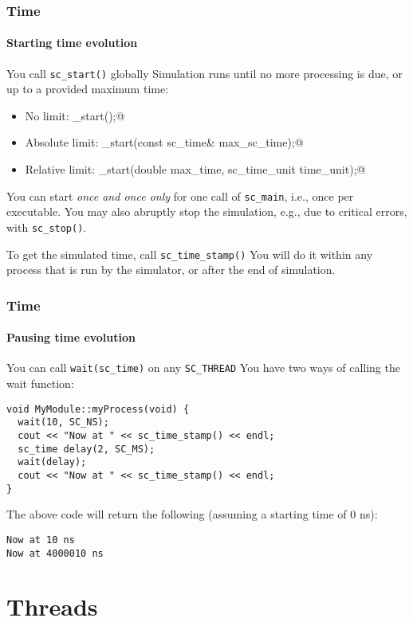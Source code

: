 \begin{frame}[fragile]
\frametitle{Time}
\framesubtitle{Starting time evolution}

\begin{block}{You call \texttt{sc\_start()} globally}
\vspace{0.5em}
Simulation runs until no more processing is due, or up to a provided maximum time:
\begin{itemize}
\item No limit: {\small \verb@sc_start();@ }
\item Absolute limit: {\small \verb@sc_start(const sc_time& max_sc_time);@ }
\item Relative limit: {\small \verb@sc_start(double max_time, sc_time_unit time_unit);@ }
\end{itemize}
You can start {\em once and once only} for one call of \texttt{sc\_main}, i.e., once per executable. You may also abruptly 
stop the simulation, e.g., due to critical errors, with \texttt{sc\_stop()}.
\end{block}
\pause
\begin{block}{To get the simulated time, call \texttt{sc\_time\_stamp()}}
You will do it within any process that is run by the simulator, or after the end of simulation.
\end{block}
\end{frame}

\begin{frame}[fragile]
\frametitle{Time}
\framesubtitle{Pausing time evolution}

\begin{block}{You can call \texttt{wait(sc\_time)} on any \texttt{SC\_THREAD}}
\vspace{0.5em}
You have two ways of calling the wait function:
{\scriptsize 
\begin{verbatim}
void MyModule::myProcess(void) {
  wait(10, SC_NS);
  cout << "Now at " << sc_time_stamp() << endl;
  sc_time delay(2, SC_MS);
  wait(delay);
  cout << "Now at " << sc_time_stamp() << endl;
}
\end{verbatim}
}
\pause
The above code will return the following (assuming a starting time of 0 ns):
{\scriptsize 
\begin{verbatim}
Now at 10 ns
Now at 4000010 ns
\end{verbatim}
}
\end{block}
\end{frame}

\section{Threads}

